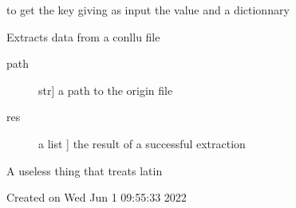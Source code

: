 \documentclass[letterpaper,10pt,english]{sphinxmanual}
\begin{document}
\begin{fulllineitems}
\label{\detokenize{index:conllu_utilities.GetKey}}
\sphinxAtStartPar
to get the key giving as input the value and a dictionnary

\end{fulllineitems}


\begin{fulllineitems}
\label{\detokenize{index:conllu_utilities.extract_conllu}}
\sphinxAtStartPar
Extracts data from a conllu file
\begin{description}
\item[{path}] \leavevmode{[}str{]}
\sphinxAtStartPar
a path to the origin file

\end{description}
\begin{description}
\item[{res}] \leavevmode{[}a list {]}
\sphinxAtStartPar
the result of a successful extraction

\end{description}

\end{fulllineitems}


\begin{fulllineitems}
\label{\detokenize{index:conllu_utilities.word_2_phoneme_lat}}
\sphinxAtStartPar
A useless thing that treats latin

\end{fulllineitems}

\label{\detokenize{index:module-0}}
\sphinxAtStartPar
Created on Wed Jun  1 09:55:33 2022
\end{document}
